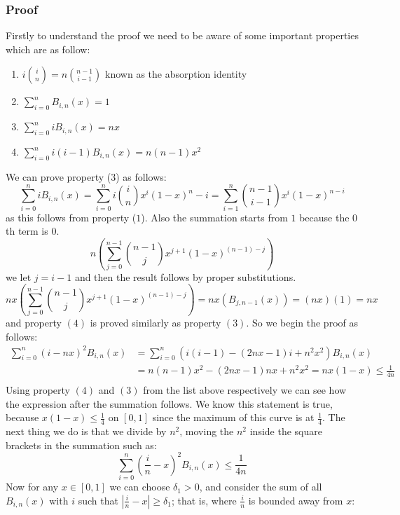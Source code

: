 \documentclass{article}
\begin{document}
\subsubsection{Proof}
Firstly to understand the proof we need to be aware of some important properties which are as follow:
\begin{enumerate}
\item $i\binom{i}{n}=n\binom{n-1}{i-1}$ known as the absorption identity
\item $\sum_{i=0}^nB_{i,n}(x)=1$
\item $\sum_{i=0}^niB_{i,n}(x)=nx$
\item $\sum_{i=0}^ni(i-1)B_{i,n}(x)=n(n-1)x^2$
\end{enumerate}
We can prove property ($3$) as follows:
\begin{equation*}
\sum_{i=0}^niB_{i,n}(x)=\sum_{i=0}^ni\binom{i}{n}x^i(1-x)^n-i=\sum_{i=1}^n\binom{n-1}{i-1}x^i(1-x)^{n-i}    
\end{equation*}
as this follows from property ($1$). Also the summation starts from $1$ because the $0$th term is $0$.
\begin{equation*}
n\left(\sum_{j=0}^{n-1}\binom{n-1}{j}x^{j+1}(1-x)^{(n-1)-j}\right)    
\end{equation*}
we let $j=i-1$ and then the result follows by proper substitutions.
\begin{equation*}
nx\left(\sum_{j=0}^{n-1}\binom{n-1}{j}x^{j+1}(1-x)^{(n-1)-j}\right)=nx\left(B_{j,n-1}(x)\right)=(nx)(1)=nx    
\end{equation*}
and property $(4)$ is proved similarly as property $(3)$. So we begin the proof as follows:
\begin{align*}
\sum_{i=0}^n(i-nx)^2B_{i,n}(x)
&=\sum_{i=0}^n(i(i-1)-(2nx-1)i+n^2 x^2)B_{i,n}(x)\\
&=n(n-1)x^2-(2nx-1)nx+n^2 x^2=nx(1-x)\leq\frac{1}{4n}\\   
\end{align*}
Using property $(4)$ and $(3)$ from the list above respectively we can see how the expression after the summation follows.
We know this statement is true, because $x(1-x)\leq\frac{1}{4}$ on $[0,1]$ since the maximum of this curve is at $\frac{1}{4}$. The next thing we do is that we divide by $n^2$, moving the $n^2$ inside the square brackets in the summation such as:
\begin{equation*}
\sum_{i=0}^n\left(\frac{i}{n}-x\right)^2B_{i,n}(x)\leq\frac{1}{4n}    
\end{equation*}
Now for any $x\in[0,1]$ we can choose $\delta_1>0$, and consider the sum of all $B_{i,n}(x)$ with $i$ such that $|\frac{i}{n}-x|\geq\delta_1$; that is, where $\frac{i}{n}$ is bounded away from $x$:
\end{document}
